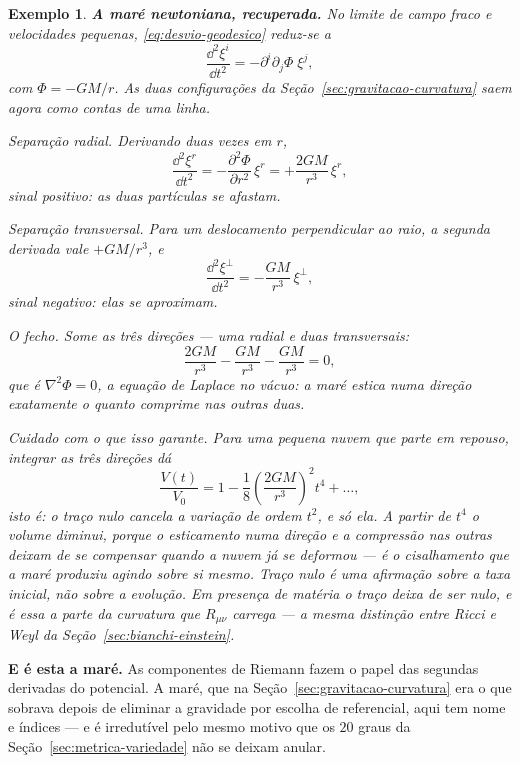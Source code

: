 \documentclass[12pt,a4paper,oneside]{book}
\theoremstyle{rgplain}
\newtheorem{example}{Exemplo}[chapter]
\theoremstyle{rgremark}
\begin{document}
\begin{example}
\label{ex:mare-newtoniana}
\textbf{A maré newtoniana, recuperada.} No limite de campo fraco e
velocidades pequenas, \eqref{eq:desvio-geodesico} reduz-se a
\[
  \frac{\dd^2\xi^i}{\dd t^2}=-\partial^i\partial_j\Phi\;\xi^j ,
\]
com $\Phi=-GM/r$. As duas configurações da
Seção~\ref{sec:gravitacao-curvatura} saem agora como contas de uma linha.

\emph{Separação radial.} Derivando duas vezes em $r$,
\[
  \frac{\dd^2\xi^r}{\dd t^2}=-\frac{\partial^2\Phi}{\partial r^2}\,\xi^r
  =+\frac{2GM}{r^3}\,\xi^r ,
\]
sinal positivo: as duas partículas se \emph{afastam}.

\emph{Separação transversal.} Para um deslocamento perpendicular ao raio, a
segunda derivada vale $+GM/r^3$, e
\[
  \frac{\dd^2\xi^\perp}{\dd t^2}=-\frac{GM}{r^3}\,\xi^\perp ,
\]
sinal negativo: elas se \emph{aproximam}.

\emph{O fecho.} Some as três direções --- uma radial e duas transversais:
\[
  \frac{2GM}{r^3}-\frac{GM}{r^3}-\frac{GM}{r^3}=0 ,
\]
que é $\nabla^2\Phi=0$, a equação de Laplace no vácuo: a maré estica numa
direção exatamente o quanto comprime nas outras duas.

\emph{Cuidado com o que isso garante.} Para uma pequena nuvem que parte
\emph{em repouso}, integrar as três direções dá
\[
  \frac{V(t)}{V_0}
  =1-\frac{1}{8}\left(\frac{2GM}{r^3}\right)^{\!2}t^4+\dots ,
\]
isto é: o traço nulo cancela a variação de ordem $t^2$, e só ela. A partir de
$t^4$ o volume \emph{diminui}, porque o esticamento numa direção e a
compressão nas outras deixam de se compensar quando a nuvem já se deformou ---
é o cisalhamento que a maré produziu agindo sobre si mesmo. Traço nulo é uma
afirmação sobre a taxa inicial, não sobre a evolução. Em presença de matéria o
traço deixa de ser nulo, e é essa a parte da curvatura que
$R_{\mu\nu}$ carrega --- a mesma distinção entre Ricci e Weyl da
Seção~\ref{sec:bianchi-einstein}.
\end{example}

\begin{central}
\textbf{E é esta a maré.} As componentes de Riemann fazem o papel das
segundas derivadas do potencial. A maré, que na
Seção~\ref{sec:gravitacao-curvatura} era o que sobrava depois de eliminar a
gravidade por escolha de referencial, aqui tem nome e índices --- e é
irredutível pelo mesmo motivo que os $20$ graus da
Seção~\ref{sec:metrica-variedade} não se deixam anular.
\end{central}
\end{document}
